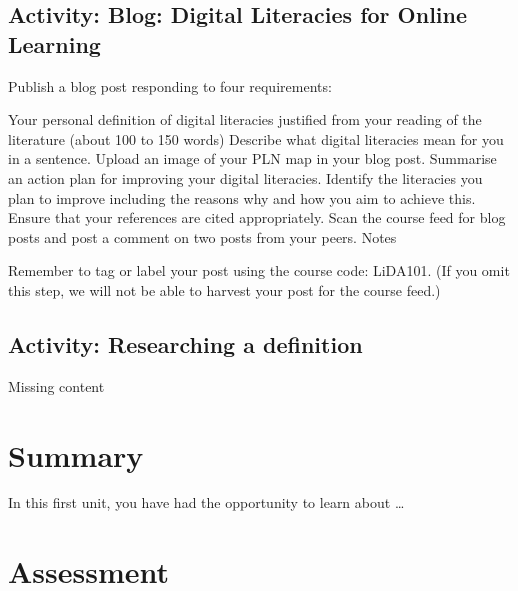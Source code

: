 \documentclass[
]{book}
\theoremstyle{definition}
\theoremstyle{definition}
\theoremstyle{definition}
\theoremstyle{definition}
\theoremstyle{remark}
\begin{document}
\hypertarget{activity-blog-digital-literacies-for-online-learning}{%
\subsection*{Activity: Blog: Digital Literacies for Online Learning}\label{activity-blog-digital-literacies-for-online-learning}}

\begin{reflect}
Publish a blog post responding to four requirements:

Your personal definition of digital literacies justified from your reading of the literature (about 100 to 150 words)
Describe what digital literacies mean for you in a sentence.
Upload an image of your PLN map in your blog post.
Summarise an action plan for improving your digital literacies. Identify the literacies you plan to improve including the reasons why and how you aim to achieve this.
Ensure that your references are cited appropriately.
Scan the course feed for blog posts and post a comment on two posts from your peers.
Notes

Remember to tag or label your post using the course code: LiDA101. (If you omit this step, we will not be able to harvest your post for the course feed.)
\end{reflect}

\hypertarget{activity-researching-a-definition-1}{%
\subsection*{Activity: Researching a definition}\label{activity-researching-a-definition-1}}

\begin{reflect}
{Missing content}
\end{reflect}

\hypertarget{summary}{%
\section*{Summary}\label{summary}}

In this first unit, you have had the opportunity to learn about \ldots{}

\hypertarget{assessment}{%
\section*{Assessment}\label{assessment}}
\end{document}

